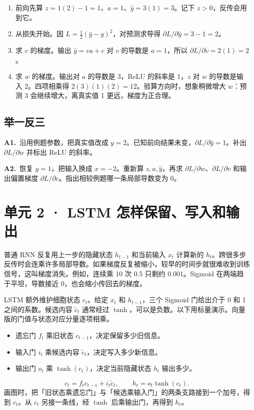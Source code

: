 \documentclass[UTF8,a4paper,11pt]{ctexart}
\newcommand{\CompactQuestion}[2]{\par\noindent\textbf{#1.}\ #2\par\vspace{.8em}}
\begin{document}
\begin{enumerate}
\item 前向先算 $z=1(2)-1=1$、$a=1$、$\hat y=3(1)=3$。记下 $z>0$，反传会用到它。
\item 从损失开始。因 $L=\tfrac12(\hat y-y)^2$，对预测求导得 $\partial L/\partial\hat y=3-1=2$。
\item 求 $v$ 的梯度。输出 $\hat y=va+c$ 对 $v$ 的导数是 $a=1$，所以 $\partial L/\partial v=2(1)=2$。
\item 求 $w$ 的梯度。输出对 $a$ 的导数是 3，ReLU 的斜率是 1，$z$ 对 $w$ 的导数是输入 2。四项相乘得 $2(3)(1)(2)=12$。验算方向时，想象稍微增大 $w$：预测 3 会继续增大，离真实值 1 更远，梯度为正合理。
\end{enumerate}
\subsection{举一反三}
\CompactQuestion{A1}{沿用例题参数，把真实值改成 $y=2$。已知前向结果未变，$\partial L/\partial\hat y=1$。补出 $\partial L/\partial w$ 并标出 ReLU 的斜率。}
\CompactQuestion{A2}{恢复 $y=1$，把输入换成 $x=-2$。重新算 $z,a,\hat y$，再求 $\partial L/\partial w$、$\partial L/\partial v$ 和输出偏置梯度 $\partial L/\partial c$。指出相较例题哪一条局部导数变为 0。}
\clearpage
\section{单元 2 · LSTM 怎样保留、写入和输出}
普通 RNN 反复用上一步的隐藏状态 $h_{t-1}$ 和当前输入 $x_t$ 计算新的 $h_t$。跨很多步反传时会连乘许多局部导数。如果梯度反复被缩小，较早的时间步就很难收到训练信号，这叫梯度消失。例如，连续乘 10 次 $0.5$ 只剩约 $0.001$。Sigmoid 在两端趋于平坦，导数接近 0，也会缩小传回去的梯度。

LSTM 额外维护细胞状态 $c_t$。给定 $x_t$ 和 $h_{t-1}$，三个 Sigmoid 门给出介于 0 和 1 之间的系数。候选内容 $\tilde c_t$ 通常经过 $\tanh$，可以是负数。以下用标量演示。向量版的门值与状态对应分量逐项相乘。

\begin{itemize}
\item 遗忘门 $f_t$ 乘旧状态 $c_{t-1}$，决定保留多少旧信息。
\item 输入门 $i_t$ 乘候选内容 $\tilde c_t$，决定写入多少新信息。
\item 输出门 $o_t$ 乘 $\tanh(c_t)$，决定当前隐藏状态 $h_t$ 输出多少。
\end{itemize}
\[c_t=f_t c_{t-1}+i_t\tilde c_t,\qquad h_t=o_t\tanh(c_t).\]
画图时，把「旧状态乘遗忘门」与「候选乘输入门」的两条支路接到一个加号，得到 $c_t$。从 $c_t$ 另接一条线，经 $\tanh$ 后乘输出门，再得到 $h_t$。
\end{document}
